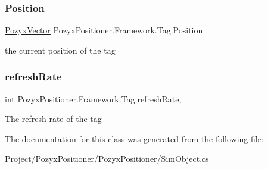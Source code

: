 \subsubsection{\texorpdfstring{Position}{Position}}
{\footnotesize\ttfamily \hyperlink{struct_pozyx_positioner_1_1_framework_1_1_pozyx_vector}{Pozyx\+Vector} Pozyx\+Positioner.\+Framework.\+Tag.\+Position\hspace{0.3cm}{\ttfamily [get]}}



the current position of the tag 

\mbox{\label{class_pozyx_positioner_1_1_framework_1_1_tag_a9010e57016df0a932c5ce8f8584ff5f9}} 
\subsubsection{\texorpdfstring{refresh\+Rate}{refreshRate}}
{\footnotesize\ttfamily int Pozyx\+Positioner.\+Framework.\+Tag.\+refresh\+Rate\hspace{0.3cm}{\ttfamily [get]}, {\ttfamily [set]}}



The refresh rate of the tag 



The documentation for this class was generated from the following file\+:\begin{DoxyCompactItemize}
\item 
Project/\+Pozyx\+Positioner/\+Pozyx\+Positioner/Sim\+Object.\+cs\end{DoxyCompactItemize}
